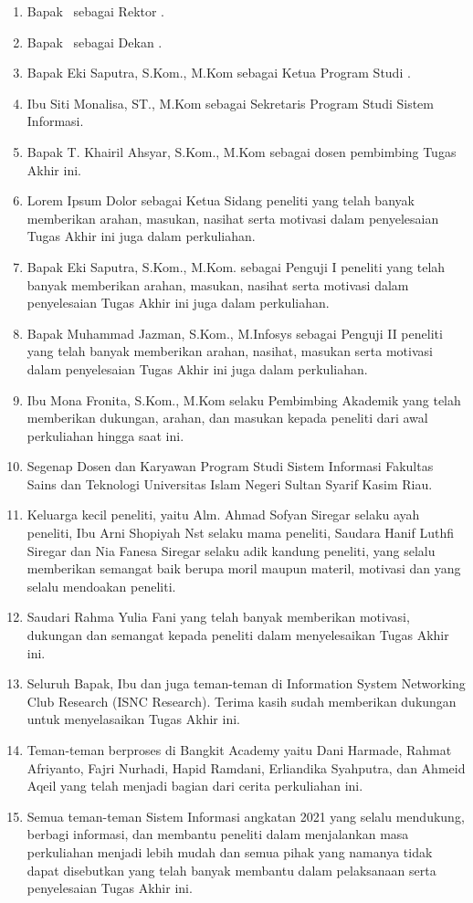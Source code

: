 \begin{enumerate}
	\item Bapak \rektor\  sebagai Rektor \universitas.
	\item Bapak \dekan\ sebagai Dekan \fakultas.
	\item Bapak Eki Saputra, S.Kom., M.Kom sebagai Ketua Program Studi \programStudi.
	\item Ibu Siti Monalisa, ST., M.Kom sebagai Sekretaris Program Studi Sistem Informasi.
	\item Bapak T. Khairil Ahsyar, S.Kom., M.Kom sebagai dosen pembimbing Tugas Akhir ini.
	\item Lorem Ipsum Dolor sebagai Ketua Sidang peneliti yang telah banyak memberikan arahan, masukan, nasihat serta motivasi dalam penyelesaian Tugas Akhir ini juga dalam perkuliahan.
	\item Bapak Eki Saputra, S.Kom., M.Kom. sebagai Penguji I peneliti yang telah banyak memberikan arahan, masukan, nasihat serta motivasi dalam penyelesaian Tugas Akhir ini juga dalam perkuliahan.
	\item Bapak Muhammad Jazman, S.Kom., M.Infosys sebagai Penguji II peneliti yang telah banyak memberikan arahan, nasihat, masukan serta motivasi dalam penyelesaian Tugas Akhir ini juga dalam perkuliahan.
	\item Ibu Mona Fronita, S.Kom., M.Kom selaku Pembimbing Akademik yang telah memberikan dukungan, arahan, dan masukan kepada peneliti dari awal perkuliahan hingga saat ini.
	\item Segenap Dosen dan Karyawan Program Studi Sistem Informasi Fakultas Sains dan Teknologi Universitas Islam Negeri Sultan Syarif Kasim Riau.
	\item Keluarga kecil peneliti, yaitu Alm. Ahmad Sofyan Siregar selaku ayah peneliti, Ibu Arni Shopiyah Nst selaku mama peneliti, Saudara Hanif Luthfi Siregar dan Nia Fanesa Siregar selaku adik kandung peneliti, yang selalu memberikan semangat baik berupa moril maupun materil, motivasi dan yang selalu mendoakan peneliti.
	\item Saudari Rahma Yulia Fani yang telah banyak memberikan motivasi, dukungan dan semangat kepada peneliti dalam menyelesaikan Tugas Akhir ini.
	\item Seluruh Bapak, Ibu dan juga teman-teman di Information System Networking Club Research (ISNC Research). Terima kasih sudah memberikan dukungan untuk menyelasaikan Tugas Akhir ini.
	\item Teman-teman berproses di Bangkit Academy yaitu Dani Harmade, Rahmat Afriyanto, Fajri Nurhadi, Hapid Ramdani, Erliandika Syahputra, dan Ahmeid Aqeil yang telah menjadi bagian dari cerita perkuliahan ini.
	\item Semua teman-teman Sistem Informasi angkatan 2021 yang selalu mendukung, berbagi informasi, dan membantu peneliti dalam menjalankan masa perkuliahan menjadi lebih mudah dan semua pihak yang namanya tidak dapat disebutkan yang telah banyak membantu dalam pelaksanaan serta penyelesaian Tugas Akhir ini.
\end{enumerate}

